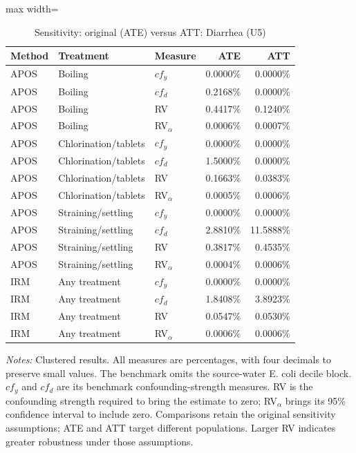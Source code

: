 \begin{table}[htbp]
\centering\scriptsize
\caption{Sensitivity: original (ATE) versus ATT: Diarrhea (U5)}
\label{tab:table-ate-att-sensitivity-diarrhea}
\begin{adjustbox}{max width=\linewidth}
\begin{tabular}{lllrr}
\toprule
Method & Treatment & Measure & ATE & ATT \\
\midrule
APOS & Boiling & $cf_y$ & 0.0000\% & 0.0000\% \\
APOS & Boiling & $cf_d$ & 0.2168\% & 0.0000\% \\
APOS & Boiling & RV & 0.4417\% & 0.1240\% \\
APOS & Boiling & RV$_\alpha$ & 0.0006\% & 0.0007\% \\
APOS & Chlorination/tablets & $cf_y$ & 0.0000\% & 0.0000\% \\
APOS & Chlorination/tablets & $cf_d$ & 1.5000\% & 0.0000\% \\
APOS & Chlorination/tablets & RV & 0.1663\% & 0.0383\% \\
APOS & Chlorination/tablets & RV$_\alpha$ & 0.0005\% & 0.0006\% \\
APOS & Straining/settling & $cf_y$ & 0.0000\% & 0.0000\% \\
APOS & Straining/settling & $cf_d$ & 2.8810\% & 11.5888\% \\
APOS & Straining/settling & RV & 0.3817\% & 0.4535\% \\
APOS & Straining/settling & RV$_\alpha$ & 0.0004\% & 0.0006\% \\
IRM & Any treatment & $cf_y$ & 0.0000\% & 0.0000\% \\
IRM & Any treatment & $cf_d$ & 1.8408\% & 3.8923\% \\
IRM & Any treatment & RV & 0.0547\% & 0.0530\% \\
IRM & Any treatment & RV$_\alpha$ & 0.0006\% & 0.0006\% \\
\bottomrule
\end{tabular}
\end{adjustbox}
\par\vspace{3pt}\begin{minipage}{\linewidth}\scriptsize\textit{Notes:} Clustered results. All measures are percentages, with four decimals to preserve small values. The benchmark omits the source-water E. coli decile block. $cf_y$ and $cf_d$ are its benchmark confounding-strength measures. RV is the confounding strength required to bring the estimate to zero; RV$_\alpha$ brings its 95\% confidence interval to include zero. Comparisons retain the original sensitivity assumptions; ATE and ATT target different populations. Larger RV indicates greater robustness under those assumptions.\end{minipage}
\end{table}
